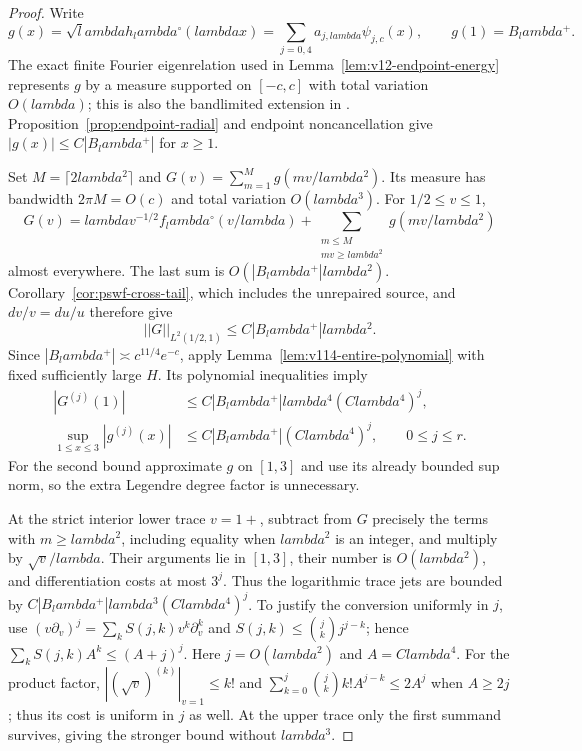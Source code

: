 \documentclass[11pt]{article}
\def\lambda{lambda}%
\def\norm#1{||#1||}%
\theoremstyle{remark}
\newcommand{\norm}[1]{\left\lVert #1\right\rVert}
\begin{document}
\begin{proof}
Write
\[
 g(x)=\sqrt\lambda h_\lambda^\circ(\lambda x)
     =\sum_{j=0,4}a_{j,\lambda}\psi_{j,c}(x),\qquad g(1)=B_\lambda^+.
\]
The exact finite Fourier eigenrelation used in
Lemma~\ref{lem:v12-endpoint-energy} represents $g$ by a measure supported
on $[-c,c]$ with total variation $O(\lambda)$; this is also the
bandlimited extension in \cite[\S30.15]{DLMFPSWF}.
Proposition~\ref{prop:endpoint-radial} and endpoint noncancellation give
$|g(x)|\le C|B_\lambda^+|$ for $x\ge1$.

Set $M=\lceil2\lambda^2\rceil$ and
$G(v)=\sum_{m=1}^M g(mv/\lambda^2)$. Its measure has bandwidth
$2\pi M=O(c)$ and total variation $O(\lambda^3)$. For $1/2\le v\le1$,
\[
 G(v)=\lambda v^{-1/2}f_\lambda^\circ(v/\lambda)
       +\sum_{\substack{m\le M\\mv\ge\lambda^2}}
                       g(mv/\lambda^2)
\]
almost everywhere. The last sum is $O(|B_\lambda^+|\lambda^2)$.
Corollary~\ref{cor:pswf-cross-tail}, which includes the unrepaired source,
and $dv/v=du/u$ therefore give
\[
 \norm G_{L^2(1/2,1)}\le C|B_\lambda^+|\lambda^2.
\]
Since $|B_\lambda^+|\asymp c^{11/4}e^{-c}$, apply
Lemma~\ref{lem:v114-entire-polynomial} with fixed sufficiently large $H$.
Its polynomial inequalities imply
\begin{align*}
 |G^{(j)}(1)|&\le C|B_\lambda^+|\lambda^4(C\lambda^4)^j,\\
 \sup_{1\le x\le3}|g^{(j)}(x)|
       &\le C|B_\lambda^+|(C\lambda^4)^j,
          \qquad 0\le j\le r.
\end{align*}
For the second bound approximate $g$ on $[1,3]$ and use its already
bounded sup norm, so the extra Legendre degree factor is unnecessary.

At the strict interior lower trace $v=1+$, subtract from $G$ precisely the
terms with $m\ge\lambda^2$, including equality when $\lambda^2$ is an
integer, and multiply by $\sqrt v/\lambda$. Their arguments lie in
$[1,3]$, their number is $O(\lambda^2)$, and differentiation costs at most
$3^j$. Thus the logarithmic trace jets are bounded by
$C|B_\lambda^+|\lambda^3(C\lambda^4)^j$.
To justify the conversion uniformly in $j$, use
$(v\partial_v)^j=\sum_k S(j,k)v^k\partial_v^k$ and
$S(j,k)\le\binom jk j^{j-k}$; hence
$\sum_k S(j,k)A^k\le(A+j)^j$. Here $j=O(\lambda^2)$ and
$A=C\lambda^4$. For the product factor, $|(\sqrt v)^{(k)}|_{v=1}\le k!$ and
$\sum_{k=0}^j\binom jk k!A^{j-k}\le2A^j$ when $A\ge2j$;
thus its cost is uniform in $j$ as well.
At the upper trace only the first summand survives, giving the stronger
bound without $\lambda^3$.


\end{proof}
\end{document}
